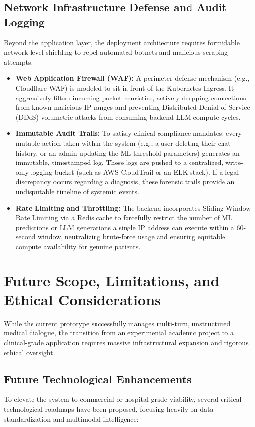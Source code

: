 \documentclass[12pt]{article}
\begin{document}
\subsection{Network Infrastructure Defense and Audit Logging}
Beyond the application layer, the deployment architecture requires formidable network-level shielding to repel automated botnets and malicious scraping attempts.
\begin{itemize}
    \item \textbf{Web Application Firewall (WAF):} A perimeter defense mechanism (e.g., Cloudflare WAF) is modeled to sit in front of the Kubernetes Ingress. It aggressively filters incoming packet heuristics, actively dropping connections from known malicious IP ranges and preventing Distributed Denial of Service (DDoS) volumetric attacks from consuming backend LLM compute cycles.
    \item \textbf{Immutable Audit Trails:} To satisfy clinical compliance mandates, every mutable action taken within the system (e.g., a user deleting their chat history, or an admin updating the ML threshold parameters) generates an immutable, timestamped log. These logs are pushed to a centralized, write-only logging bucket (such as AWS CloudTrail or an ELK stack). If a legal discrepancy occurs regarding a diagnosis, these forensic trails provide an undisputable timeline of systemic events.
    \item \textbf{Rate Limiting and Throttling:} The backend incorporates Sliding Window Rate Limiting via a Redis cache to forcefully restrict the number of ML predictions or LLM generations a single IP address can execute within a 60-second window, neutralizing brute-force usage and ensuring equitable compute availability for genuine patients.
\end{itemize}

\section{Future Scope, Limitations, and Ethical Considerations}

While the current prototype successfully manages multi-turn, unstructured medical dialogue, the transition from an experimental academic project to a clinical-grade application requires massive infrastructural expansion and rigorous ethical oversight.

\subsection{Future Technological Enhancements}
To elevate the system to commercial or hospital-grade viability, several critical technological roadmaps have been proposed, focusing heavily on data standardization and multimodal intelligence:
\end{document}
